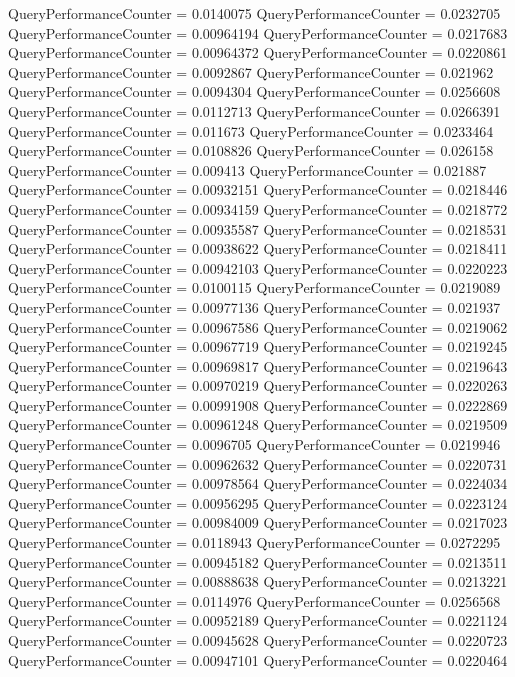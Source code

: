 \documentclass[9pt]{article}
\theoremstyle{plain}
\theoremstyle{definition}
\theoremstyle{remark}
\numberwithin{equation}{section}
\begin{document}
QueryPerformanceCounter  =  0.0140075
QueryPerformanceCounter  =  0.0232705
QueryPerformanceCounter  =  0.00964194
QueryPerformanceCounter  =  0.0217683
QueryPerformanceCounter  =  0.00964372
QueryPerformanceCounter  =  0.0220861
QueryPerformanceCounter  =  0.0092867
QueryPerformanceCounter  =  0.021962
QueryPerformanceCounter  =  0.0094304
QueryPerformanceCounter  =  0.0256608
QueryPerformanceCounter  =  0.0112713
QueryPerformanceCounter  =  0.0266391
QueryPerformanceCounter  =  0.011673
QueryPerformanceCounter  =  0.0233464
QueryPerformanceCounter  =  0.0108826
QueryPerformanceCounter  =  0.026158
QueryPerformanceCounter  =  0.009413
QueryPerformanceCounter  =  0.021887
QueryPerformanceCounter  =  0.00932151
QueryPerformanceCounter  =  0.0218446
QueryPerformanceCounter  =  0.00934159
QueryPerformanceCounter  =  0.0218772
QueryPerformanceCounter  =  0.00935587
QueryPerformanceCounter  =  0.0218531
QueryPerformanceCounter  =  0.00938622
QueryPerformanceCounter  =  0.0218411
QueryPerformanceCounter  =  0.00942103
QueryPerformanceCounter  =  0.0220223
QueryPerformanceCounter  =  0.0100115
QueryPerformanceCounter  =  0.0219089
QueryPerformanceCounter  =  0.00977136
QueryPerformanceCounter  =  0.021937
QueryPerformanceCounter  =  0.00967586
QueryPerformanceCounter  =  0.0219062
QueryPerformanceCounter  =  0.00967719
QueryPerformanceCounter  =  0.0219245
QueryPerformanceCounter  =  0.00969817
QueryPerformanceCounter  =  0.0219643
QueryPerformanceCounter  =  0.00970219
QueryPerformanceCounter  =  0.0220263
QueryPerformanceCounter  =  0.00991908
QueryPerformanceCounter  =  0.0222869
QueryPerformanceCounter  =  0.00961248
QueryPerformanceCounter  =  0.0219509
QueryPerformanceCounter  =  0.0096705
QueryPerformanceCounter  =  0.0219946
QueryPerformanceCounter  =  0.00962632
QueryPerformanceCounter  =  0.0220731
QueryPerformanceCounter  =  0.00978564
QueryPerformanceCounter  =  0.0224034
QueryPerformanceCounter  =  0.00956295
QueryPerformanceCounter  =  0.0223124
QueryPerformanceCounter  =  0.00984009
QueryPerformanceCounter  =  0.0217023
QueryPerformanceCounter  =  0.0118943
QueryPerformanceCounter  =  0.0272295
QueryPerformanceCounter  =  0.00945182
QueryPerformanceCounter  =  0.0213511
QueryPerformanceCounter  =  0.00888638
QueryPerformanceCounter  =  0.0213221
QueryPerformanceCounter  =  0.0114976
QueryPerformanceCounter  =  0.0256568
QueryPerformanceCounter  =  0.00952189
QueryPerformanceCounter  =  0.0221124
QueryPerformanceCounter  =  0.00945628
QueryPerformanceCounter  =  0.0220723
QueryPerformanceCounter  =  0.00947101
QueryPerformanceCounter  =  0.0220464
\end{document}
